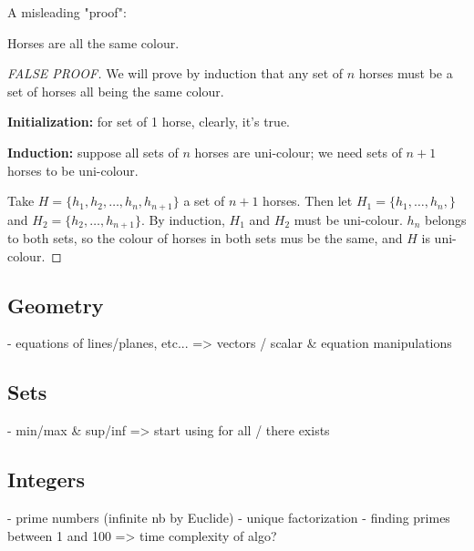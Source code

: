 A misleading "proof":
\begin{property}
    Horses are all the same colour.
\end{property}
\begin{proof}[FALSE PROOF]
    We will prove by induction that any set of $n$ horses must be a set of horses all being the same colour.
    
    \textbf{Initialization:} for set of 1 horse, clearly, it's true.
    
    \textbf{Induction:} suppose all sets of $n$ horses are uni-colour; we need sets of $n+1$ horses to be uni-colour.
    
    Take $H=\{ h_1, h_2, \dots, h_n, h_{n+1} \}$ a set of $n+1$ horses.
    Then let $H_1 = \{ h_1, \dots, h_n, \}$ and $H_2 = \{ h_2, \dots, h_{n+1} \}$.
    By induction, $H_1$ and $H_2$ must be uni-colour.
    $h_n$ belongs to both sets, so the colour of horses in both sets mus be the same, and $H$ is uni-colour.
\end{proof}



\subsection{Geometry}
- equations of lines/planes, etc... => vectors / scalar \& equation manipulations
\subsection{Sets}
- min/max \& sup/inf => start using for all / there exists
\subsection{Integers}
- prime numbers (infinite nb by Euclide)
- unique factorization 
- finding primes between 1 and 100 => time complexity of algo?